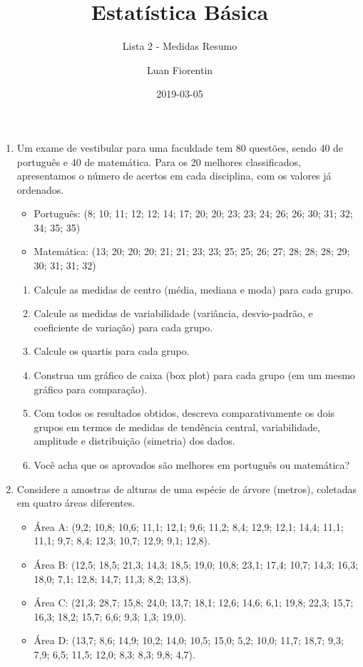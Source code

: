 \documentclass[]{article}
\title{Estatística Básica}
\subtitle{Lista 2 - Medidas Resumo}
\author{Luan Fiorentin}
\date{2019-03-05}
\providecommand{\tightlist}{%
  \setlength{\itemsep}{0pt}\setlength{\parskip}{0pt}}
\begin{document}
\maketitle

\begin{enumerate}
\def\labelenumi{\arabic{enumi}.}
\tightlist
\item
  Um exame de vestibular para uma faculdade tem 80 questões, sendo 40 de
  português e 40 de matemática. Para os 20 melhores classificados,
  apresentamos o número de acertos em cada disciplina, com os valores já
  ordenados.

  \begin{itemize}
  \tightlist
  \item
    Português: (8; 10; 11; 12; 12; 14; 17; 20; 20; 23; 23; 24; 26; 26;
    30; 31; 32; 34; 35; 35)
  \item
    Matemática: (13; 20; 20; 20; 21; 21; 23; 23; 25; 25; 26; 27; 28; 28;
    28; 29; 30; 31; 31; 32)
  \end{itemize}

  \begin{enumerate}
  \def\labelenumii{(\alph{enumii})}
  \tightlist
  \item
    Calcule as medidas de centro (média, mediana e moda) para cada
    grupo.
  \item
    Calcule as medidas de variabilidade (variância, desvio-padrão, e
    coeficiente de variação) para cada grupo.
  \item
    Calcule os quartis para cada grupo.
  \item
    Construa um gráfico de caixa (box plot) para cada grupo (em um mesmo
    gráfico para comparação).
  \item
    Com todos os resultados obtidos, descreva comparativamente os dois
    grupos em termos de medidas de tendência central, variabilidade,
    amplitude e distribuição (simetria) dos dados.
  \item
    Você acha que os aprovados são melhores em português ou matemática?
  \end{enumerate}
\item
  Considere a amostras de alturas de uma espécie de árvore (metros),
  coletadas em quatro áreas diferentes.

  \begin{itemize}
  \tightlist
  \item
    Área A: (9,2; 10,8; 10,6; 11,1; 12,1; 9,6; 11,2; 8,4; 12,9; 12,1;
    14,4; 11,1; 11,1; 9,7; 8,4; 12,3; 10,7; 12,9; 9,1; 12,8).
  \item
    Área B: (12,5; 18,5; 21,3; 14,3; 18,5; 19,0; 10,8; 23,1; 17,4; 10,7;
    14,3; 16,3; 18,0; 7,1; 12,8; 14,7; 11,3; 8,2; 13,8).
  \item
    Área C: (21,3; 28,7; 15,8; 24,0; 13,7; 18,1; 12,6; 14,6; 6,1; 19,8;
    22,3; 15,7; 16,3; 18,2; 15,7; 6,6; 9,3; 1,3; 19,0).
  \item
    Área D: (13,7; 8,6; 14,9; 10,2; 14,0; 10,5; 15,0; 5,2; 10,0; 11,7;
    18,7; 9,3; 7,9; 6,5; 11,5; 12,0; 8,3; 8,3; 9,8; 4,7).
  \end{itemize}


\end{enumerate}
\end{document}
